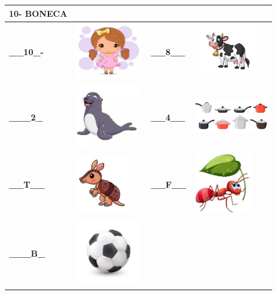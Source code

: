 {\begin{longtable}[]{@{}llll@{}}
\begin{minipage}[b]{0.24\columnwidth}
\textbf{10- BONECA}\strut
\end{minipage}\tabularnewline
\midrule
\endhead
\textbf{\_\_10\_-} &
\includegraphics[width=1.16667in,height=0.96319in]{media/image16.jpeg} &
\textbf{\_\_8\_\_} &
\includegraphics[width=1.16127in,height=0.95833in]{media/image17.jpeg}\tabularnewline
\textbf{\_\_\_2\_} &
\includegraphics[width=1.09375in,height=1.09375in]{media/image18.jpeg} &
\textbf{\_\_4\_\_} &
\includegraphics[width=1.27986in,height=0.98958in]{media/image19.jpeg}\tabularnewline
\textbf{\_\_T\_\_} &
\includegraphics[width=0.92708in,height=0.92708in]{media/image20.jpeg} &
\textbf{\_\_F\_\_} &
\includegraphics[width=0.97986in,height=1.05208in]{media/image21.jpeg}\tabularnewline
\textbf{\_\_\_B\_} &
\includegraphics[width=1.13542in,height=1.13542in]{media/image22.jpeg} &

\end{longtable}}
